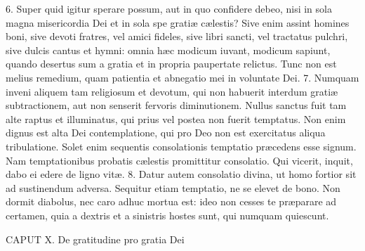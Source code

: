 6. Super quid igitur sperare possum, aut in quo confidere debeo, nisi in sola magna misericordia Dei et in sola spe gratiæ cælestis? Sive enim assint homines boni, sive devoti fratres, vel amici fideles, sive libri sancti, vel tractatus pulchri, sive dulcis cantus et hymni: omnia hæc modicum iuvant, modicum sapiunt, quando desertus sum a gratia et in propria paupertate relictus. Tunc non est melius remedium, quam patientia et abnegatio mei in voluntate Dei.
7. Numquam inveni aliquem tam religiosum et devotum, qui non habuerit interdum gratiæ subtractionem, aut non senserit fervoris diminutionem. Nullus sanctus fuit tam alte raptus et illuminatus, qui prius vel postea non fuerit temptatus. Non enim dignus est alta Dei contemplatione, qui pro Deo non est exercitatus aliqua tribulatione. Solet enim sequentis consolationis temptatio præcedens esse signum. Nam temptationibus probatis cælestis promittitur consolatio. Qui vicerit, inquit, dabo ei edere de ligno vitæ.
8. Datur autem consolatio divina, ut homo fortior sit ad sustinendum adversa. Sequitur etiam temptatio, ne se elevet de bono. Non dormit diabolus, nec caro adhuc mortua est: ideo non cesses te præparare ad certamen, quia a dextris et a sinistris hostes sunt, qui numquam quiescunt.


CAPUT X.
De gratitudine pro gratia Dei

